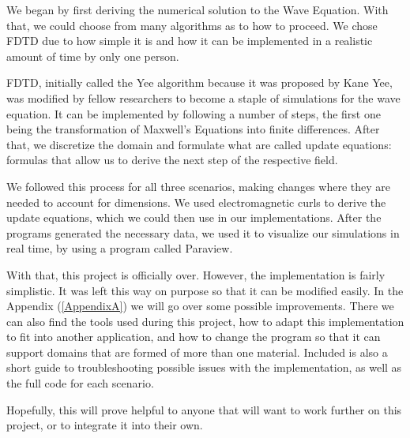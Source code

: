 We began by first deriving the numerical solution to the Wave Equation. With that, we could choose from many algorithms as to how to proceed. We chose FDTD due to how simple it is and how it can be implemented in a realistic amount of time by only one person\textsuperscript{\cite{davidson2010computational}}. 

FDTD, initially called the Yee algorithm because it was proposed by Kane Yee, was modified by fellow researchers to become a staple of simulations for the wave equation. It can be implemented by following a number of steps, the first one being the transformation of Maxwell's Equations into finite differences. After that, we discretize the domain and formulate what are called update equations: formulas that allow us to derive the next step of the respective field.

We followed this process for all three scenarios, making changes where they are needed to account for dimensions. We used electromagnetic curls to derive the update equations, which we could then use in our implementations. After the programs generated the necessary data, we used it to visualize our simulations in real time, by using a program called Paraview\textsuperscript{\cite{paraview}}.

With that, this project is officially over. However, the implementation is fairly simplistic. It was left this way on purpose so that it can be modified easily. In the Appendix (\ref{AppendixA}) we will go over some possible improvements. There we can also find the tools used during this project, how to adapt this implementation to fit into another application, and how to change the program so that it can support domains that are formed of more than one material. Included is also a short guide to troubleshooting possible issues with the implementation, as well as the full code for each scenario.

Hopefully, this will prove helpful to anyone that will want to work further on this project, or to integrate it into their own.